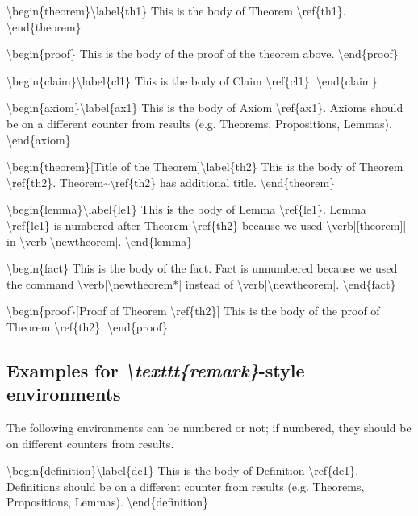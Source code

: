 \documentclass[qe,nameyear,draft]{econsocart}
\theoremstyle{plain}
\theoremstyle{remark}
\begin{document}
{\textbackslash}begin\{theorem\}{\textbackslash}label\{th1\}
This is the body of Theorem {\textbackslash}ref\{th1\}.
{\textbackslash}end\{theorem\}

{\textbackslash}begin\{proof\}
This is the body of the proof of the theorem above.
{\textbackslash}end\{proof\}

{\textbackslash}begin\{claim\}{\textbackslash}label\{cl1\}
This is the body of Claim {\textbackslash}ref\{cl1\}.
{\textbackslash}end\{claim\}

{\textbackslash}begin\{axiom\}{\textbackslash}label\{ax1\}
This is the body of Axiom {\textbackslash}ref\{ax1\}. Axioms should be on a different counter from results (e.g. Theorems, Propositions, Lemmas).
{\textbackslash}end\{axiom\}

{\textbackslash}begin\{theorem\}[Title of the Theorem]{\textbackslash}label\{th2\}
This is the body of Theorem {\textbackslash}ref\{th2\}. Theorem{\textasciitilde}{\textbackslash}ref\{th2\} has additional title.
{\textbackslash}end\{theorem\}

{\textbackslash}begin\{lemma\}{\textbackslash}label\{le1\}
This is the body of Lemma {\textbackslash}ref\{le1\}. Lemma {\textbackslash}ref\{le1\} is numbered after
Theorem {\textbackslash}ref\{th2\} because we used {\textbackslash}verb|[theorem]| in {\textbackslash}verb|{\textbackslash}newtheorem|.
{\textbackslash}end\{lemma\}

{\textbackslash}begin\{fact\}
This is the body of the fact. Fact is unnumbered because we used the command {\textbackslash}verb|{\textbackslash}newtheorem*|
instead of {\textbackslash}verb|{\textbackslash}newtheorem|.
{\textbackslash}end\{fact\}

{\textbackslash}begin\{proof\}[Proof of Theorem {\textbackslash}ref\{th2\}]
This is the body of the proof of Theorem {\textbackslash}ref\{th2\}.
{\textbackslash}end\{proof\}

\subsection{Examples for \textit{{\textbackslash}texttt\{remark\}}-style environments}

The following environments can be numbered or not; if numbered, they should be on different counters from results.

{\textbackslash}begin\{definition\}{\textbackslash}label\{de1\}
This is the body of Definition {\textbackslash}ref\{de1\}. Definitions should be on a different counter from results (e.g. Theorems, Propositions, Lemmas).
{\textbackslash}end\{definition\}
\end{document}
